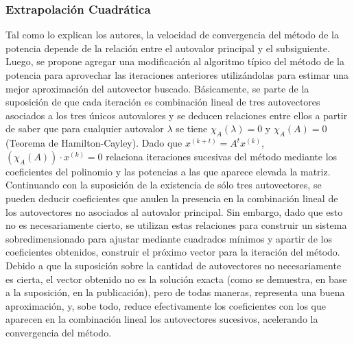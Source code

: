 \subsubsection{Extrapolación Cuadrática}
Tal como lo explican los autores, la velocidad de convergencia del método de la potencia depende  de la relación entre el autovalor principal  y el subsiguiente. Luego, se propone agregar una modificación al algoritmo típico del método de la potencia para aprovechar las iteraciones anteriores utilizándolas para estimar  una mejor aproximación del autovector buscado. Básicamente, se parte de la suposición de que cada iteración es combinación lineal de tres autovectores asociados a los tres únicos autovalores y se deducen relaciones entre ellos a partir de saber que para cualquier autovalor $\lambda$ se tiene $\chi_A(\lambda) = 0$ y $\chi_A(A) = 0$ (Teorema de Hamilton-Cayley). Dado que $x^{(k+t)} = A^tx^{(k)}$, $(\chi_A(A)) \cdot x^{(k)} = 0$ relaciona iteraciones sucesivas del método mediante los coeficientes del polinomio y las potencias a las que aparece elevada la matriz. Continuando con la suposición de la existencia de sólo tres autovectores, se pueden deducir coeficientes que anulen la presencia en la combinación lineal de los autovectores no asociados al autovalor principal. Sin embargo, dado que esto no es necesariamente cierto, se utilizan estas relaciones para construir un sistema sobredimensionado para ajustar mediante cuadrados mínimos y apartir de los coeficientes obtenidos, construir el próximo vector para la iteración del método. Debido a que la suposición sobre la cantidad de autovectores no necesariamente es cierta, el vector obtenido no es la solución exacta (como se demuestra, en base a la suposición, en la publicación), pero de todas maneras, representa una buena aproximación, y, sobe todo, reduce efectivamente los coeficientes con los que aparecen en la combinación lineal los autovectores sucesivos, acelerando la convergencia del método.
